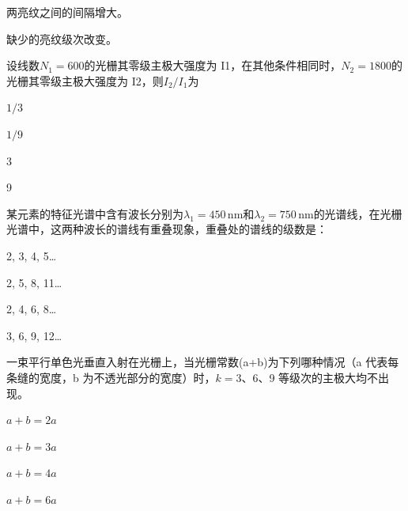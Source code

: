 \documentclass[standard, analysis, notocnum]{ExBook}
\newcommand{\answerarea}[1][8cm]{%
  \par\vspace{2mm}%
  \noindent{\color{themeColor!35}\rule{\linewidth}{0.4pt}}\par
  \noindent\begin{minipage}[t][#1][t]{\linewidth}\vspace{0pt}\end{minipage}\par
  \noindent{\color{themeColor!35}\rule{\linewidth}{0.4pt}}\par
}
\begin{document}
\begin{qitems}
\begin{bbox}
\par\noindent\hspace{2em}两亮纹之间的间隔增大。
\par\noindent\hspace{2em}缺少的亮纹级次改变。
\answerarea[3.5cm]
\end{bbox}
\begin{bbox}
\qitem 设线数$N_{1}=600$的光栅其零级主极大强度为 I1，在其他条件相同时，$N_{2}=1800$的光栅其零级主极大强度为 I2，则$I_{2}/I_{1}$为
\par\noindent\hspace{2em}$1/3$
\par\noindent\hspace{2em}$1/9$
\par\noindent\hspace{2em}3
\par\noindent\hspace{2em}9
\answerarea[3.5cm]
\end{bbox}
\begin{bbox}
\qitem 某元素的特征光谱中含有波长分别为$\lambda_{1}=450\,\mathrm{nm}$和$\lambda_{2}=750\,\mathrm{nm}$的光谱线，在光栅光谱中，这两种波长的谱线有重叠现象，重叠处的谱线的级数是：
\par\noindent\hspace{2em}2, 3, 4, 5…
\par\noindent\hspace{2em}2, 5, 8, 11…
\par\noindent\hspace{2em}2, 4, 6, 8…
\par\noindent\hspace{2em}3, 6, 9, 12…
\answerarea[3.5cm]
\end{bbox}
\begin{bbox}
\qitem 一束平行单色光垂直入射在光栅上，当光栅常数(a+b)为下列哪种情况（a 代表每条缝的宽度，b 为不透光部分的宽度）时，$k=3$、6、9 等级次的主极大均不出现。
\par\noindent\hspace{2em}$a+b=2a$
\par\noindent\hspace{2em}$a+b=3a$
\par\noindent\hspace{2em}$a+b=4a$
\par\noindent\hspace{2em}$a+b=6a$
\answerarea[3.5cm]
\end{bbox}
\end{qitems}
\end{document}
